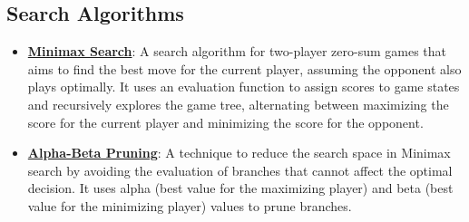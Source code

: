 \documentclass{article}%
\begin{document}
\subsection{Search Algorithms}%
\label{subsec:SearchAlgorithms}%
\begin{itemize}[leftmargin=*]%
\item \href{\url{https://purdue.brightspace.com/d2l/common/assets/pdfjs-d2l-dist/1.0.14-legacy/web/viewer.html?file=\%252Fcontent\%252Fenforced\%252F1095467-wl.202510.CS.24300.001\%252F02L2-Intro.pdf\%253Fou\%253D1095467\&lang=en-us\&container=d2l-fileviewer-rendered-pdf\&fullscreen=d2l-fileviewer-rendered-pdf-dialog\&height=667}#page=22}{\textbf{Minimax Search}}: A search algorithm for two-player zero-sum games that aims to find the best move for the current player, assuming the opponent also plays optimally. It uses an evaluation function to assign scores to game states and recursively explores the game tree, alternating between maximizing the score for the current player and minimizing the score for the opponent.%
\item \href{\url{https://purdue.brightspace.com/d2l/common/assets/pdfjs-d2l-dist/1.0.14-legacy/web/viewer.html?file=\%252Fcontent\%252Fenforced\%252F1095467-wl.202510.CS.24300.001\%252F02L2-Intro.pdf\%253Fou\%253D1095467\&lang=en-us\&container=d2l-fileviewer-rendered-pdf\&fullscreen=d2l-fileviewer-rendered-pdf-dialog\&height=667}#page=23}{\textbf{Alpha-Beta Pruning}}: A technique to reduce the search space in Minimax search by avoiding the evaluation of branches that cannot affect the optimal decision. It uses alpha (best value for the maximizing player) and beta (best value for the minimizing player) values to prune branches.%
\end{itemize}

%
\end{document}
